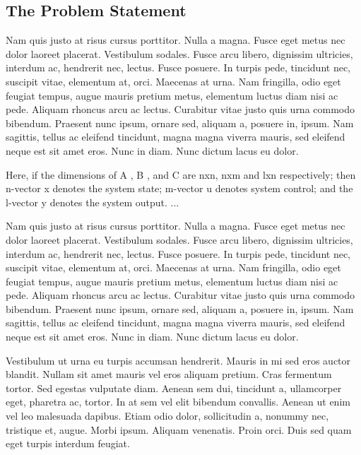 \documentclass[12pt]{report}
\def\newnot#1{\label{#1}}
\begin{document}
\subsection{The Problem Statement}    

Nam quis justo at risus cursus porttitor. Nulla a magna. Fusce eget metus nec dolor laoreet placerat. Vestibulum sodales. Fusce arcu libero, dignissim ultricies, interdum ac, hendrerit nec, lectus. Fusce posuere. In turpis pede, tincidunt nec, suscipit vitae, elementum at, orci. Maecenas at urna. Nam fringilla, odio eget feugiat tempus, augue mauris pretium metus, elementum luctus diam nisi ac pede. Aliquam rhoncus arcu ac lectus. Curabitur vitae justo quis urna commodo bibendum. Praesent nunc ipsum, ornare sed, aliquam a, posuere in, ipsum. Nam sagittis, tellus ac eleifend tincidunt, magna magna viverra mauris, sed eleifend neque est sit amet eros. Nunc in diam. Nunc dictum lacus eu dolor.

Here, if the dimensions of A  \newnot{symbol:A}, B  \newnot{symbol:B}, and C  \newnot{symbol:C} are nxn, nxm and lxn  \newnot{symbol:nml} respectively; then n-vector x\newnot{symbol:x} denotes the system state; m-vector u denotes system control; and the l-vector y denotes the system output. ... 

Nam quis justo at risus cursus porttitor. Nulla a magna. Fusce eget metus nec dolor laoreet placerat. Vestibulum sodales. Fusce arcu libero, dignissim ultricies, interdum ac, hendrerit nec, lectus. Fusce posuere. In turpis pede, tincidunt nec, suscipit vitae, elementum at, orci. Maecenas at urna. Nam fringilla, odio eget feugiat tempus, augue mauris pretium metus, elementum luctus diam nisi ac pede. Aliquam rhoncus arcu ac lectus. Curabitur vitae justo quis urna commodo bibendum. Praesent nunc ipsum, ornare sed, aliquam a, posuere in, ipsum. Nam sagittis, tellus ac eleifend tincidunt, magna magna viverra mauris, sed eleifend neque est sit amet eros. Nunc in diam. Nunc dictum lacus eu dolor.


Vestibulum ut urna eu turpis accumsan hendrerit. Mauris in mi sed eros auctor blandit. Nullam sit amet mauris vel eros aliquam pretium. Cras fermentum tortor. Sed egestas vulputate diam. Aenean sem dui, tincidunt a, ullamcorper eget, pharetra ac, tortor. In at sem vel elit bibendum convallis. Aenean ut enim vel leo malesuada dapibus. Etiam odio dolor, sollicitudin a, nonummy nec, tristique et, augue. Morbi ipsum. Aliquam venenatis. Proin orci. Duis sed quam eget turpis interdum feugiat.
\end{document}
